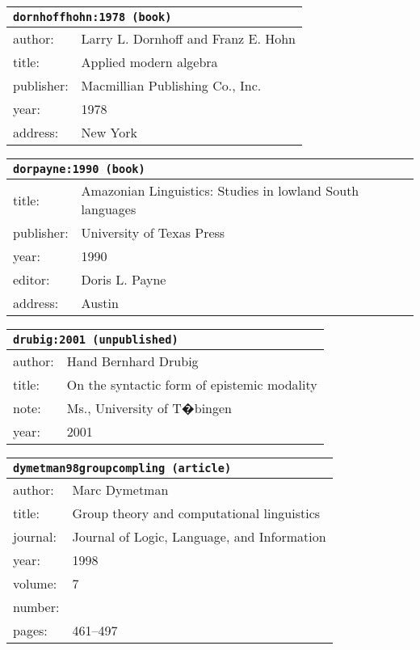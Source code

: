 \documentclass{article}
\begin{document}
\bigskip

\begin{tabular}{p{}p{}}
\multicolumn{2}{l}{\texttt{dornhoffhohn:1978 (book)}}\\
\hline
author: & Larry L. Dornhoff and Franz E. Hohn\\
title: & Applied modern algebra\\
publisher: & Macmillian Publishing Co., Inc.\\
year: & 1978\\
address: & New York\\
\end{tabular}

\bigskip

\begin{tabular}{p{}p{}}
\multicolumn{2}{l}{\texttt{dorpayne:1990 (book)}}\\
\hline
title: & Amazonian Linguistics: Studies in lowland South languages\\
publisher: & University of Texas Press\\
year: & 1990\\
editor: & Doris L. Payne\\
address: & Austin\\
\end{tabular}

\bigskip

\begin{tabular}{p{}p{}}
\multicolumn{2}{l}{\texttt{drubig:2001 (unpublished)}}\\
\hline
author: & Hand Bernhard Drubig\\
title: & On the syntactic form of epistemic modality\\
note: & \textsc{M}s., University of T�bingen\\
year: & 2001\\
\end{tabular}

\bigskip

\begin{tabular}{p{}p{}}
\multicolumn{2}{l}{\texttt{dymetman98groupcompling (article)}}\\
\hline
author: & Marc Dymetman\\
title: & Group theory and computational linguistics\\
journal: & Journal of Logic, Language, and Information\\
year: & 1998\\
volume: & 7\\
number: & \\
pages: & 461--497\\
\end{tabular}
\end{document}
